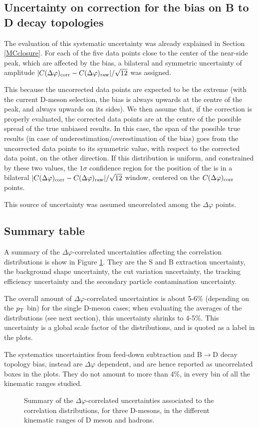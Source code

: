 \subsection{Uncertainty on correction for the bias on B to D decay topologies}
The evaluation of this systematic uncertainty was already explained in Section \ref{MCclosure}. For each of the five data points close to the center of the near-side peak, which are affected by the bias, a bilateral and symmetric uncertainty of amplitude $|C(\Delta\varphi)_{\rm corr} - C(\Delta\varphi)_{\rm raw}|/\sqrt{12}$ was assigned.

This because the uncorrected data points are expected to be the extreme (with the current D-meson selection, the bias is always upwards at the centre of the peak, and always upwards on its sides). We then assume that, if the correction is properly evaluated, the corrected data points are at the centre of the possible spread of the true unbiased results. In this case, the span of the possible true results (in case of underestimation/overestimation of the bias) goes from the uncorrected data points to its symmetric value, with respect to the corrected data point, on the other direction. If this distribution is uniform, and constrained by these two values, the $1\sigma$ confidence region for the position of the is in a bilateral $|C(\Delta\varphi)_{\rm corr} - C(\Delta\varphi)_{\rm raw}|/\sqrt{12}$ window, centered on the $C(\Delta\varphi)_{\rm corr}$ points.

This source of uncertainty was assumed uncorrelated among the $\Delta\varphi$ points.

\subsection{Summary table}
A summary of the $\Delta\varphi$-correlated uncertainties affecting the correlation distributions is show in Figure \ref{fig:SystOverall}. They are the S and B extraction uncertainty, the background shape uncertainty, the cut variation uncertainty, the tracking efficiency uncertainty and the secondary particle contamination uncertainty.

The overall amount of $\Delta\varphi$-correlated uncertainties is about 5-6\% (depending on the $p_{\rm T}$ bin) for the single D-meson cases; when evaluating the averages of the distributions (see next section), this uncertainty shrinks to 4-5\%. This uncertainty is a global scale factor of the distributions, and is quoted as a label in the plots.

The systematics uncertainties from feed-down subtraction and B$\rightarrow$D decay topology bias, instead are $\Delta\varphi$ dependent, and are hence reported as uncorrelated boxes in the plots.  They do not amount to more than 4\%, in every bin of all the kinematic ranges studied.
\begin{figure}[h]
\centering
{}
\caption{Summary of the $\Delta\varphi$-correlated uncertainties associated to the correlation distributions, for three D-mesons, in the different kinematic ranges of D meson and hadrons.}
\label{fig:SystOverall}
\end{figure}
